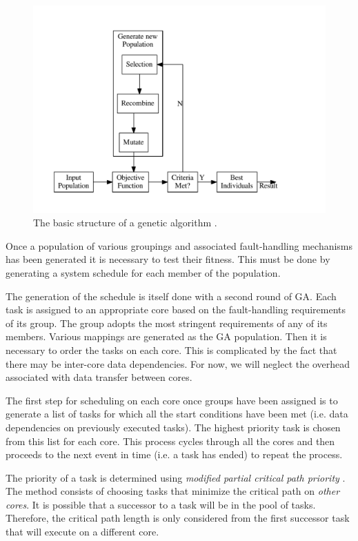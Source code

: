 \documentclass{article}
\begin{document}
\begin{figure}[h]
\centering
\includegraphics[width=12cm]{figures/ga_ov}
\caption{The basic structure of a genetic algorithm \cite{geatbx}.}
\label{f:ga_ov}
\end{figure}

Once a population of various groupings and associated fault-handling mechanisms has been generated it is necessary to test their fitness. This must be done by generating a system schedule for each member of the population. 

The generation of the schedule is itself done with a second round of GA. Each task is assigned to an appropriate core based on the fault-handling requirements of its group. The group adopts the most stringent requirements of any of its members. Various mappings are generated as the GA population. Then it is necessary to order the tasks on each core. This is complicated by the fact that there may be inter-core data dependencies. For now, we will neglect the overhead associated with data transfer between cores.

The first step for scheduling on each core once groups have been assigned is to generate a list of tasks for which all the start conditions have been met (i.e. data dependencies on previously executed tasks). The highest priority task is chosen from this list for each core. This process cycles through all the cores and then proceeds to the next event in time (i.e. a task has ended) to repeat the process. 

The priority of a task is determined using \emph{modified partial critical path priority} \cite{eles2000scheduling}. The method consists of choosing tasks that minimize the critical path on \emph{other cores}. It is possible that a successor to a task will be in the pool of tasks. Therefore, the critical path length is only considered from the first successor task that will execute on a different core. 
\end{document}
